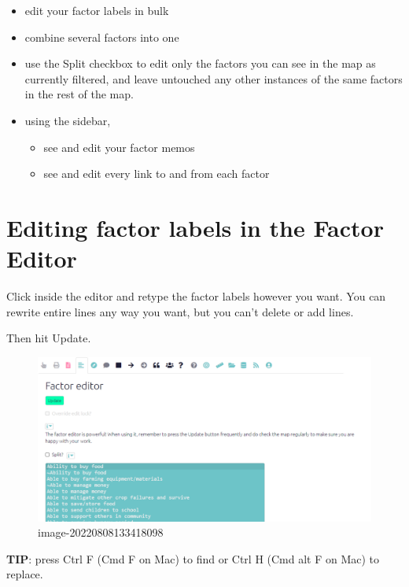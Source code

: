 \documentclass[
]{book}
\providecommand{\tightlist}{%
  \setlength{\itemsep}{0pt}\setlength{\parskip}{0pt}}
\begin{document}
\begin{itemize}
\tightlist
\item
  edit your factor labels in bulk
\item
  combine several factors into one
\item
  use the Split checkbox to edit only the factors you can see in the map as currently filtered, and leave untouched any other instances of the same factors in the rest of the map.
\item
  using the sidebar,

  \begin{itemize}
  \tightlist
  \item
    see and edit your factor memos
  \item
    see and edit every link to and from each factor
  \end{itemize}
\end{itemize}

\hypertarget{editing-factor-labels-in-the-factor-editor}{%
\section{Editing factor labels in the Factor Editor}\label{editing-factor-labels-in-the-factor-editor}}

Click inside the editor and retype the factor labels however you want. You can rewrite entire lines any way you want, but you can't delete or add lines.

Then hit Update.

\begin{figure}
\centering
\includegraphics[width=6.77083in,height=\textheight]{_assets/image-20220808133418098.png}
\caption{image-20220808133418098}
\end{figure}

\textbf{TIP}: press Ctrl F (Cmd F on Mac) to find or Ctrl H (Cmd alt F on Mac) to replace.
\end{document}
